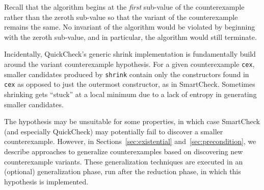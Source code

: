 \documentclass{sigplanconf}
\newenvironment{code}{\begin{alltt}\footnotesize}{\end{alltt}}
\newcommand{\ttp}[1]{\texttt{#1}}
\begin{document}
Recall that the algorithm begins at the \emph{first} sub-value of the
counterexample rather than the zeroth sub-value so that the variant of the
counterexample remains the same.  No invariant of the algorithm would be
violated by beginning with the zeroth sub-value, and in particular, the
algorithm would still terminate.

Incidentally, QuickCheck's generic shrink implementation is fundamentally build
around the variant counterexample hypothesis.  For a given counterexample
\ttp{cex}, smaller candidates produced by \ttp{shrink} contain only the
constructors found in \ttp{cex} as opposed to just the outermost constructor, as
in SmartCheck.  Sometimes shrinking gets ``stuck'' at a local minimum due to a
lack of entropy in generating smaller candidates.

The hypothesis may be unsuitable for some properties, in which case SmartCheck
(and especially QuickCheck) may potentially fail to discover a smaller
counterexample.  However, in Sections~\ref{sec:existential}
and~\ref{sec:precondition}, we describe approaches to generalize counterexamples
based on discovering new counterexample variants.  These generalization
techniques are executed in an (optional) generalization phase, run after the
reduction phase, in which this hypothesis is implemented.



\end{document}
